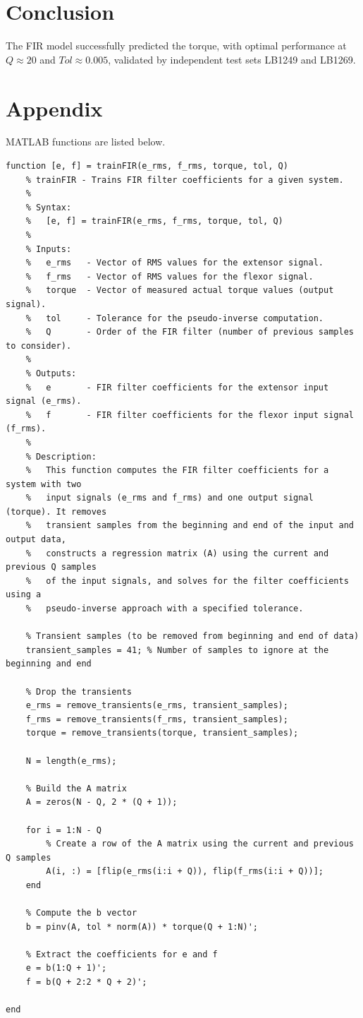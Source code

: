 \documentclass[12pt]{article}
\begin{document}
\section*{Conclusion}
The FIR model successfully predicted the torque, with optimal performance at $Q \approx 20$ and $Tol \approx 0.005$, validated by independent test sets LB1249 and LB1269.

\newpage
\section*{Appendix}
MATLAB functions are listed below.

\begin{lstlisting}[caption={trainFIR.m}]
function [e, f] = trainFIR(e_rms, f_rms, torque, tol, Q)
    % trainFIR - Trains FIR filter coefficients for a given system.
    %
    % Syntax:
    %   [e, f] = trainFIR(e_rms, f_rms, torque, tol, Q)
    %
    % Inputs:
    %   e_rms   - Vector of RMS values for the extensor signal.
    %   f_rms   - Vector of RMS values for the flexor signal.
    %   torque  - Vector of measured actual torque values (output signal).
    %   tol     - Tolerance for the pseudo-inverse computation.
    %   Q       - Order of the FIR filter (number of previous samples to consider).
    %
    % Outputs:
    %   e       - FIR filter coefficients for the extensor input signal (e_rms).
    %   f       - FIR filter coefficients for the flexor input signal (f_rms).
    %
    % Description:
    %   This function computes the FIR filter coefficients for a system with two
    %   input signals (e_rms and f_rms) and one output signal (torque). It removes
    %   transient samples from the beginning and end of the input and output data,
    %   constructs a regression matrix (A) using the current and previous Q samples
    %   of the input signals, and solves for the filter coefficients using a
    %   pseudo-inverse approach with a specified tolerance.

    % Transient samples (to be removed from beginning and end of data)
    transient_samples = 41; % Number of samples to ignore at the beginning and end

    % Drop the transients
    e_rms = remove_transients(e_rms, transient_samples);
    f_rms = remove_transients(f_rms, transient_samples);
    torque = remove_transients(torque, transient_samples);

    N = length(e_rms);

    % Build the A matrix
    A = zeros(N - Q, 2 * (Q + 1));

    for i = 1:N - Q
        % Create a row of the A matrix using the current and previous Q samples
        A(i, :) = [flip(e_rms(i:i + Q)), flip(f_rms(i:i + Q))];
    end

    % Compute the b vector
    b = pinv(A, tol * norm(A)) * torque(Q + 1:N)';

    % Extract the coefficients for e and f
    e = b(1:Q + 1)';
    f = b(Q + 2:2 * Q + 2)';

end
\end{lstlisting}
\end{document}
